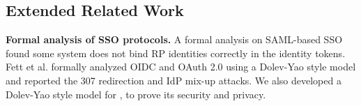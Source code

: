 \begin{comment}
Although \usso\ employs the same mathematical algorithms in its identity transformations as the OPRF protocol \cite{oprf-proved,voprf-proved}, we prove more properties of these algorithms to ensure security and privacy. %
\usso\ depends on the \emph{obliviousness} property to ensure IdP untraceability, %
the \emph{deterministicness} property of \emph{pseudo-random} functions to enable the RP to derive a permanent account for any $t$, and the \emph{randomness} property to provide RP unlinkability. %
Last but not least, \usso\ requires an additional property for SSO services, called \emph{RP designation}.
It is satisfied \emph{only if} no collision exists in RPs' pseudo-identities (see Lemma 1), which are actually the blinded inputs of the evaluated pseudo-random function \cite{oprf-proved,voprf-proved}.
This property %
is not explicitly required in other OPRF-based solutions and therefore may not be supported by all OPRF protocols. Thus, an OPRF protocol is not always ready to implement identity transformations in \usso, unless no collision exists in the blinded inputs.



\end{comment}

\subsection{Extended Related Work}
\noindent\textbf{Formal analysis of SSO protocols.}
A formal analysis on SAML-based SSO \cite{ArmandoCCCT08} found some system does not bind RP identities correctly in the identity tokens.
Fett et al. \cite{FettKS16, FettKS17} formally analyzed OIDC and OAuth 2.0 using a Dolev-Yao style model \cite{FettKS14} and reported the 307 redirection and IdP mix-up attacks.
We also developed a Dolev-Yao style model for \usso, to prove its security and privacy.



